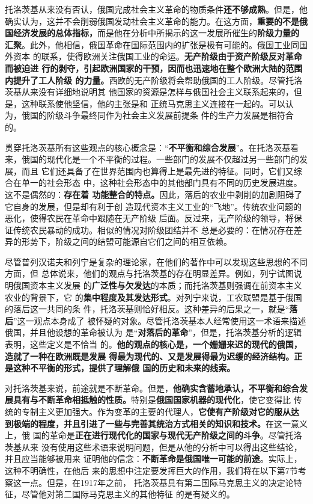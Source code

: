 托洛茨基从来没有否认，俄国完成社会主义革命的物质条件\textbf{还不够成熟}。但是，他
确实认为，这并不会削弱俄国发动社会主义革命的能力。在这方面，\textbf{重要的不是俄
  国经济发展的总体指标，}而是他在分析中所揭示的这一发展所催生的\textbf{阶级力量的
  汇聚}。此外，他相信，俄国革命在国际范围内的扩张是极有可能的。俄国工业同国外资本
的联系，使得欧洲关注俄国工业的命运。\textbf{无产阶级由于资产阶级反对革命而被迫进
  行的剥夺，引起欧洲国家的干预，因而也迅速地在整个欧洲大陆的范围内提升了工人阶级
  的力量。}西欧的无产阶级将会帮助俄国的工人阶级。尽管托洛茨基从来没有详细地说明其
他国家的资源是怎样与俄国社会主义联系起来的，但是，这种联系使他坚信，他的主张是和
正统马克思主义连接在一起的。可以认为，俄国的阶级斗争最终同作为社会主义发展前提条
件的生产力发展是相符合的。

贯穿托洛茨基所有这些观点的核心概念是：“\textbf{不平衡和综合发展}”。在托洛茨基看
来，俄国的现代化是一个不平衡的过程。一些部门的发展不仅超过另一些部门的发展，而且
它们还具备了在世界范围内也算得上是最先进的特征。同时，它们又综合在单一的社会形态
中，这种社会形态中的其他部门具有不同的历史发展进度。这不是偶然的：\textbf{存在着
  功能整合的特点。}因此，落后的农业中剥削的加剧阻碍了它自身的发展，但是却有利于创
造现代资本主义工业的“飞地”。传统农业问题的恶化，使得农民在革命中跟随在无产阶级
后面。反过来，无产阶级的领导，将保证传统农民暴动的成功。相似的情况对阶级团结并不
总是必要的：在情况存在差异的形势下，阶级之间的结盟可能源自它们之间的相互依赖。

尽管普列汉诺夫和列宁是复杂的理论家，在他们的著作中可以发现这些思想的不同方面，但
总体说来，他们的观点与托洛茨基的存在明显差异。例如，列宁试图说明俄国资本主义发展
的\textbf{广泛性与欠发达}的本质；而托洛茨基则强调在前资本主义农业的背景下，它
的\textbf{集中程度及其发达形式}。对列宁来说，工农联盟是基于俄国的落后这一共同的条
件，托洛茨基则恰好相反。这种差异的后果之一，就是“\textbf{落后}”这一观点本身成了
被怀疑的对象。尽管托洛茨基本人经常使用这一术语来描述俄国，并且他设想的革命被认为
是“\textbf{对落后的革命}”，但是，托洛茨基分析的逻辑表明，这些定义是不恰当
的。\textbf{他的观点的核心是，一个姗姗来迟的现代的俄国，造就了一种在欧洲既是发展
  得最为现代的、又是发展得最为迟缓的经济结构。正是这种不平衡的形式，提供了理解俄
  国的历史和未来的线索。 }

对托洛茨基来说，前途就是不断革命。但是，\textbf{他确实含蓄地承认，不平衡和综合发
  展具有与不断革命相抵触的性质。}特别是\textbf{俄国国家机器的现代化}，使它变得比
传统的专制主义更加强大。作为变革的主要的代理人，\textbf{它使有产阶级对它的服从达
  到极端的程度，并且引进了一些与完善其统治方式相关的知识和技术。}在这一意义上，俄
国的革命是\textbf{正在进行现代化的国家与现代无产阶级之间的斗争}。尽管托洛茨基从来
没有使用这些术语来说明问题，但是从他的分析中可以得出这些结论，并且应当能够被用来
证明他的信念：\textbf{不断革命是俄国唯一可能的前途}。实际上，这种不明确性，在他后
来的思想中注定要发挥巨大的作用，我们将在以下第7节考察这一点。但是，在1917年之前，
托洛茨基具有第二国际马克思主义的决定论特征，尽管他对第二国际马克思主义的其他特征
的是有疑义的。

